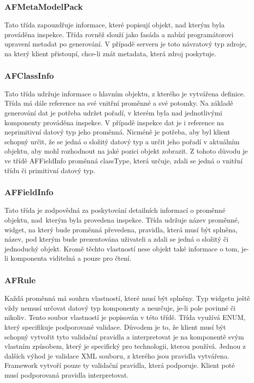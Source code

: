 \subsubsection{AFMetaModelPack}
Tato třída zapouzdřuje informace, které popisují objekt, nad kterým byla prováděna inspekce. Třída rovněž slouží jako fasáda a nabízí programátorovi upravení metadat po generování. V případě serveru je toto návratový typ zdroje, na který klient přistoupí, chce-li znát metadata, která zdroj poskytuje.
\subsubsection{AFClassInfo}
Tato třída udržuje informace o hlavním objektu, z kterého je vytvářena definice. Třída má dále reference na své vnitřní proměnné a své potomky. Na základě generování dat je potřeba udržet pořadí, v kterém byla nad jednotlivými komponenty prováděna inspekce. V případě inspekce dat je i reference na neprimitivní datový typ jeho proměnná. Nicméně je potřeba, aby byl klient schopný určit, že se jedná o složitý datový typ a určit jeho pořadí v aktuálním objektu, aby mohl rozhodnout na jaké pozici objekt zobrazit. Z tohoto důvodu je ve třídě AFFieldInfo proměnná classType, která určuje, zdali se jedná o vnitřní třídu či primitivní datový typ.
\subsubsection{AFFieldInfo}
Tato třída je zodpovědná za poskytování detailních informací o proměnné objektu, nad~kterým byla provedena inspekce. Třída udržuje název proměnné, widget, na který bude proměnná převedena, pravidla, která musí být splněna, název, pod kterým bude prezentována uživateli a zdali se jedná o složitý či jednoduchý objekt. Kromě těchto vlastností nese objekt také informace o tom, je-li komponenta viditelná a pouze pro čtení.
\subsubsection{AFRule}
Každá proměnná má souhrn vlastností, které musí být splněny. Typ widgetu ještě vždy nemusí určovat datový typ komponenty a neurčuje, je-li pole povinné či nikoliv. Tento soubor vlastností je popisován v této třídě. Třída využívá ENUM, který specifikuje podporované validace. Důvodem je to, že klient musí být schopný vytvořit tyto validační pravidla a interpretovat je na komponentě svým vlastním způsobem, který je specifický pro technologii, kterou používá. Jednou z dalších výhod je validace XML souboru, z kterého jsou pravidla vytvářena. Framework vytvoří pouze ty validační pravidla, která podporuje. Klient poté musí podporovaná pravidla interpretovat. 
